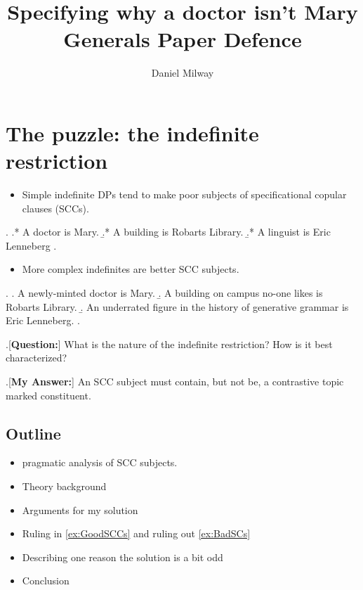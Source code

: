 \documentclass[letterpaper]{article}
\title{Specifying why a doctor isn't Mary\\
  Generals Paper Defence
}
\author{Daniel Milway}
\begin{document}
\maketitle
\maketitle
\section{The puzzle: the indefinite restriction}
\begin{itemize}
  \item Simple indefinite DPs tend to make poor subjects of specificational copular clauses (SCCs).
\end{itemize}
\ex.\label{ex:BadSCs} 
\a.* A doctor is Mary.
\b.* A building is Robarts Library.
\b.* A linguist is Eric Lenneberg
\z.

\begin{itemize}
  \item More complex indefinites are better SCC subjects.
\end{itemize}
\ex.\label{ex:GoodSCCs}
\a. A newly-minted doctor is Mary.
\b. A building on campus no-one likes is Robarts Library.
\b. An underrated figure in the history of generative grammar is Eric Lenneberg.
\z.

\ex.[\textbf{Question:}] What is the nature of the indefinite restriction? How is it best characterized?

\ex.[\textbf{My Answer:}] An SCC subject must contain, but not be, a contrastive topic marked constituent.

\subsection{Outline}
\begin{itemize}
  \item {} pragmatic analysis of SCC subjects. 
  \item Theory background \parencite{buring2003d}
  \item Arguments for my solution
  \item Ruling in \ref{ex:GoodSCCs} and ruling out \ref{ex:BadSCs}
  \item Describing one reason the solution is a bit odd
  \item Conclusion
\end{itemize}
\end{document}
